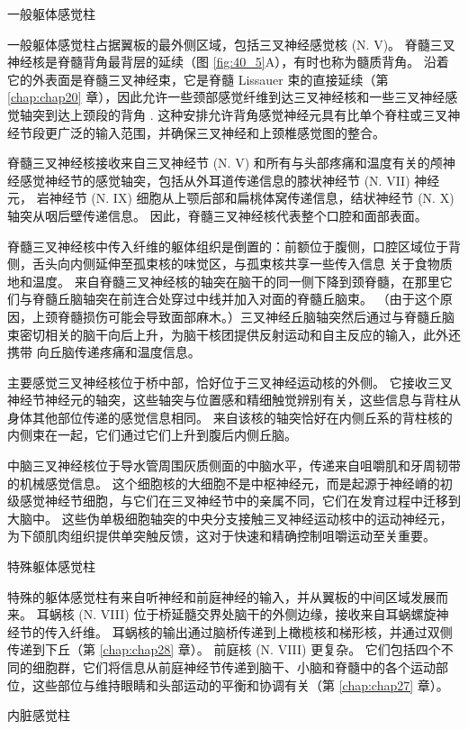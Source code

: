 一般躯体感觉柱

一般躯体感觉柱占据翼板的最外侧区域，包括三叉神经感觉核 (N. V)。 脊髓三叉神经核是脊髓背角最背层的延续（图 \ref{fig:40_5}A），有时也称为髓质背角。 沿着它的外表面是脊髓三叉神经束，它是脊髓 Lissauer 束的直接延续（第 \ref{chap:chap20} 章），因此允许一些颈部感觉纤维到达三叉神经核和一些三叉神经感觉轴突到达上颈段的背角 . 这种安排允许背角感觉神经元具有比单个脊柱或三叉神经节段更广泛的输入范围，并确保三叉神经和上颈椎感觉图的整合。

脊髓三叉神经核接收来自三叉神经节 (N. V) 和所有与头部疼痛和温度有关的颅神经感觉神经节的感觉轴突，包括从外耳道传递信息的膝状神经节 (N. VII) 神经元， 岩神经节 (N. IX) 细胞从上颚后部和扁桃体窝传递信息，结状神经节 (N. X) 轴突从咽后壁传递信息。 因此，脊髓三叉神经核代表整个口腔和面部表面。

脊髓三叉神经核中传入纤维的躯体组织是倒置的：前额位于腹侧，口腔区域位于背侧，舌头向内侧延伸至孤束核的味觉区，与孤束核共享一些传入信息 关于食物质地和温度。 来自脊髓三叉神经核的轴突在脑干的同一侧下降到颈脊髓，在那里它们与脊髓丘脑轴突在前连合处穿过中线并加入对面的脊髓丘脑束。 （由于这个原因，上颈脊髓损伤可能会导致面部麻木。）三叉神经丘脑轴突然后通过与脊髓丘脑束密切相关的脑干向后上升，为脑干核团提供反射运动和自主反应的输入，此外还携带 向丘脑传递疼痛和温度信息。

主要感觉三叉神经核位于桥中部，恰好位于三叉神经运动核的外侧。 它接收三叉神经节神经元的轴突，这些轴突与位置感和精细触觉辨别有关，这些信息与背柱从身体其他部位传递的感觉信息相同。 来自该核的轴突恰好在内侧丘系的背柱核的内侧束在一起，它们通过它们上升到腹后内侧丘脑。

中脑三叉神经核位于导水管周围灰质侧面的中脑水平，传递来自咀嚼肌和牙周韧带的机械感觉信息。 这个细胞核的大细胞不是中枢神经元，而是起源于神经嵴的初级感觉神经节细胞，与它们在三叉神经节中的亲属不同，它们在发育过程中迁移到大脑中。 这些伪单极细胞轴突的中央分支接触三叉神经运动核中的运动神经元，为下颌肌肉组织提供单突触反馈，这对于快速和精确控制咀嚼运动至关重要。

特殊躯体感觉柱

特殊的躯体感觉柱有来自听神经和前庭神经的输入，并从翼板的中间区域发展而来。 耳蜗核 (N. VIII) 位于桥延髓交界处脑干的外侧边缘，接收来自耳蜗螺旋神经节的传入纤维。 耳蜗核的输出通过脑桥传递到上橄榄核和梯形核，并通过双侧传递到下丘（第 \ref{chap:chap28} 章）。 前庭核 (N. VIII) 更复杂。 它们包括四个不同的细胞群，它们将信息从前庭神经节传递到脑干、小脑和脊髓中的各个运动部位，这些部位与维持眼睛和头部运动的平衡和协调有关（第 \ref{chap:chap27} 章）。

内脏感觉柱

